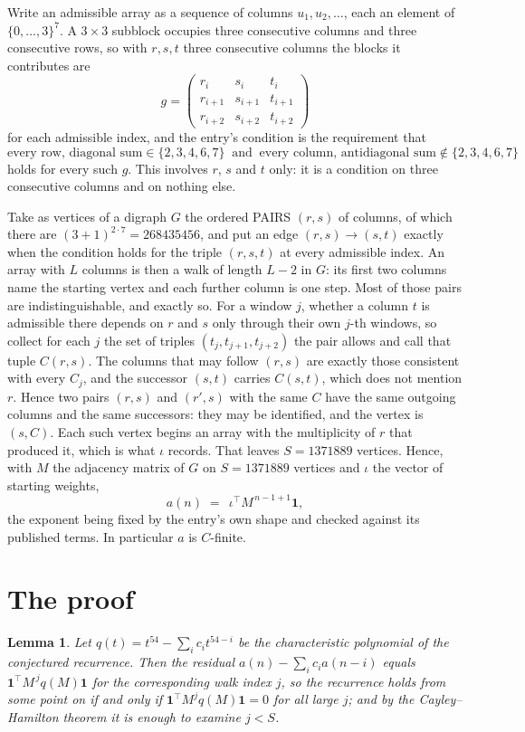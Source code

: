 \documentclass[11pt,a4paper]{article}
\theoremstyle{plain}
\newtheorem{lemma}[theorem]{Lemma}
\theoremstyle{definition}
\begin{document}
Write an admissible array as a sequence of columns $u_1,u_2,\dots$, each an element of
$\{0,\dots,3\}^{7}$. A $3\times3$ subblock occupies three consecutive columns and
three consecutive rows, so with $r,s,t$ three consecutive columns the blocks it
contributes are
\[
g=\begin{pmatrix}r_i&s_i&t_i\\ r_{i+1}&s_{i+1}&t_{i+1}\\ r_{i+2}&s_{i+2}&t_{i+2}\end{pmatrix}
\]
for each admissible index, and the entry's condition is the requirement that
\[
\text{every row, diagonal sum} \in \{2,3,4,6,7\}\ \text{ and }\ \text{every column, antidiagonal sum} \notin \{2,3,4,6,7\}
\]
holds for every such $g$. This involves $r$, $s$ and $t$ only: it is a condition on
three consecutive columns and on nothing else.

Take as vertices of a digraph $G$ the ordered PAIRS $(r,s)$ of columns, of which there are
$(3+1)^{2\cdot7}=268435456$, and put an edge $(r,s)\to(s,t)$ exactly when the condition
holds for the triple $(r,s,t)$ at every admissible index. An array with $L$ columns is then a
walk of length $L-2$ in $G$: its first two columns name the starting vertex and each further
column is one step. Most of those pairs are indistinguishable, and exactly so. For a window $j$, whether a column $t$ is admissible there depends on $r$ and $s$ only through their own $j$-th windows, so collect for each $j$ the set of triples $(t_j,t_{j+1},t_{j+2})$ the pair allows and call that tuple $C(r,s)$. The columns that may follow $(r,s)$ are exactly those consistent with every $C_j$, and the successor $(s,t)$ carries $C(s,t)$, which does not mention $r$. Hence two pairs $(r,s)$ and $(r',s)$ with the same $C$ have the same outgoing columns and the same successors: they may be identified, and the vertex is $(s,C)$. Each such vertex begins an array with the multiplicity of $r$ that produced it, which is what $\iota$ records. That leaves $S=1371889$ vertices. Hence, with $M$ the adjacency matrix of $G$ on $S=1371889$ vertices and
$\iota$ the vector of starting weights,
\[
a(n)\;=\;\,\iota^{\!\top}M^{\,n-1+1}\mathbf{1},
\]
the exponent being fixed by the entry's own shape and checked against its published terms.
In particular $a$ is $C$-finite.

\section{The proof}

\begin{lemma}\label{lem:crit}
Let $q(t)=t^{54}-\sum_i c_it^{54-i}$ be the characteristic polynomial of the
conjectured recurrence. Then the residual $a(n)-\sum_ic_ia(n-i)$ equals
$\mathbf{1}^{\!\top}M^{\,j}q(M)\mathbf{1}$ for the corresponding walk index
$j$, so the recurrence holds from some point on if and only if
$\mathbf{1}^{\!\top}M^{j}q(M)\mathbf{1}=0$ for all large $j$; and by the
Cayley--Hamilton theorem it is enough to examine $j<S$.
\end{lemma}
\end{document}
